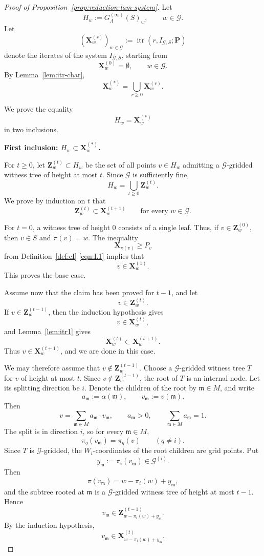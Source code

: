 \documentclass[10pt]{amsart}
\theoremstyle{plain}
\theoremstyle{definition}
\providecommand{\cG}[0]{\ensuremath{\mathcal G}\xspace}
\providecommand{\bP}[0]{\ensuremath{\mathbf P}\xspace}
\providecommand{\bX}[0]{\ensuremath{\mathbf X}\xspace}
\providecommand{\bZ}[0]{\ensuremath{\mathbf Z}\xspace}
\let\geq\geqslant
\newcommand{\fm}{\mathfrak{m}}
\begin{document}
\begin{proof}[Proof of Proposition~\ref{prop:reduction-lam-system}]
Let
\[
        H_w:=G_\Lambda^{(\infty)}(S)_w,\qquad w\in \cG.
\]
Let
\[
        (\bX_w^{(r)})_{w\in \cG}:=\operatorname{itr}(r,I_{\cG,S};\bP)
\]
denote the iterates of the system \(I_{\cG,S}\), starting from
\[
        \bX_w^{(0)}=\emptyset,\qquad w\in \cG.
\]
By Lemma~\ref{lem:itr-char},
\[
        \bX_w^{(*)}=\bigcup_{r\geq 0}\bX_w^{(r)}.
\]

We prove the equality
\[
        H_w=\bX_w^{(*)}
\]
in two inclusions.

\medskip
\noindent
\textbf{First inclusion: \(H_w\subset \bX_w^{(*)}\).}

For \(t\geq 0\), let \(\bZ_w^{(t)}\subset H_w\) be the set of all points
\(v\in H_w\) admitting a \(\cG\)-gridded witness tree of height at most
\(t\).  Since \(\cG\) is sufficiently fine,
\[
        H_w=\bigcup_{t\geq 0}\bZ_w^{(t)}.
\]
We prove by induction on \(t\) that
\[
        \bZ_w^{(t)}\subset \bX_w^{(t+1)}
        \qquad\text{for every }w\in \cG.
\]

For \(t=0\), a witness tree of height \(0\) consists of a single leaf.
Thus, if \(v\in \bZ_w^{(0)}\), then \(v\in S\) and \(\pi(v)=w\).  The
inequality
\[
        \bX_{\pi(v)}\geq P_v
\]
from Definition~\ref{def:cI} \eqref{eqn:I.1} implies that
\[
        v\in \bX_w^{(1)}.
\]
This proves the base case.

Assume now that the claim has been proved for \(t-1\), and let
\[
        v\in \bZ_w^{(t)}.
\]
If \(v\in \bZ_w^{(t-1)}\), then the induction hypothesis gives
\[
        v\in \bX_w^{(t)},
\]
and Lemma~\ref{lem:itr1} gives
\[
        \bX_w^{(t)}\subset \bX_w^{(t+1)}.
\]
Thus \(v\in \bX_w^{(t+1)}\), and we are done in this case.

We may therefore assume that \(v\notin \bZ_w^{(t-1)}\).  Choose a
\(\cG\)-gridded witness tree \(T\) for \(v\) of height at most \(t\).
Since \(v\notin \bZ_w^{(t-1)}\), the root of \(T\) is an internal node.
Let its splitting direction be \(i\).  Denote the children of the root
by \(\fm\in M\), and write
\[
        a_\fm:=\alpha(\fm),\qquad v_\fm:=v(\fm).
\]
Then
\[
        v=\sum_{\fm\in M}a_\fm \cdot v_\fm,\qquad
        a_\fm>0,\qquad \sum_{\fm\in M}a_\fm=1.
\]
The split is in direction \(i\), so for every \(\fm\in M\),
\[
        \pi_q(v_\fm)=\pi_q(v)\qquad(q\neq i).
\]
Since \(T\) is \(\cG\)-gridded, the \(W_i\)-coordinates of the root
children are grid points. Put
\[
        y_\fm:=\pi_i(v_\fm)\in \cG^{(i)}.
\]
Then
\[
        \pi(v_\fm)=w-\pi_i(w)+y_\fm,
\]
and the subtree rooted at \(\fm\) is a \(\cG\)-gridded witness tree of
height at most \(t-1\).  Hence
\[
        v_\fm\in \bZ_{w-\pi_i(w)+y_\fm}^{(t-1)}.
\]
By the induction hypothesis,
\[
        v_\fm\in \bX_{w-\pi_i(w)+y_\fm}^{(t)}.
\]


\end{proof}
\end{document}
